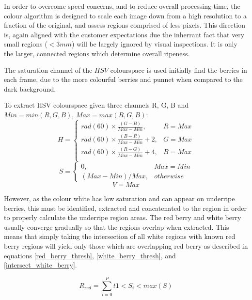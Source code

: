 \documentclass[conference]{IEEEtran}
\begin{document}
In order to overcome speed concerns, and to reduce overall processing time, the colour algorithm is designed to scale each image down from a high resolution to a fraction of the original, and assess regions comprised of less pixels. This direction is, again aligned with the customer expectations due the inherrant fact that very small regions ($<3mm$) will be largely ignored by visual inspections. It is only the larger, connected regions which determine overall ripeness.

The saturation channel of the $HSV$ colourspace is used initially find the berries in each frame, due to the more colourful berries and punnet when compared to the dark background. 

To extract HSV colourspace given three channels R, G, B and $Min = min(R, G, B)$, $Max = max(R, G, B)$:
\begin{equation}
H = 
\begin{cases} 
rad(60) \times \frac{(G-B)}{Max-Min}, & R=Max \\
rad(60) \times \frac{(B-R)}{Max-Min} + 2, & G=Max \\
rad(60) \times \frac{(R-G)}{Max-Min} + 4, & B=Max \\   
\end{cases}
\end{equation}
\begin{equation}
S = 
\begin{cases} 
0, & Max=Min \\   
(Max-Min)/Max, & otherwise        
\end{cases}
\end{equation}
\begin{equation}
V = Max
\end{equation}


However, as the colour white has low saturation and can appear on underripe berries, this must be identified, extracted and concatenated to the region in order to properly calculate the underripe region areas. The red berry and white berry usually converge gradually so that the regions overlap when extracted. This means that simply taking the intersection of all white regions with known red berry regions will yield only those which are overlapping red berry as described in equations \ref{red_berry_thresh}, \ref{white_berry_thresh}, and \ref{intersect_white_berry}.

\begin{equation}
	R_{red} = \sum_{i=0}^{P}t1<S_i<max(S)
	\label{red_berry_thresh}
\end{equation}
\end{document}
